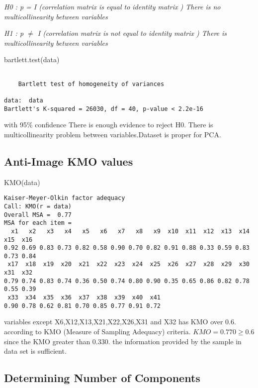 \documentclass[12pt,twoside]{deuthesis}
\newenvironment{Shaded}{\begin{snugshade}}{\end{snugshade}}
\newcommand{\FunctionTok}[1]{\textcolor[rgb]{0.00,0.00,0.00}{#1}}
\newcommand{\NormalTok}[1]{#1}
\begin{document}
\emph{H0 : p = I (correlation matrix is equal to identity matrix ) There is no multicollinearity between variables}

\setlength{\parindent}{0in}

\emph{H1 : p \(\neq\) I (correlation matrix is not equal to identity matrix ) There is multicollinearity between variables}
\begin{Shaded}
\begin{Highlighting}[]
\FunctionTok{bartlett.test}\NormalTok{(data)}
\end{Highlighting}
\end{Shaded}
\begin{verbatim}

    Bartlett test of homogeneity of variances

data:  data
Bartlett's K-squared = 26030, df = 40, p-value < 2.2e-16
\end{verbatim}
with 95\% confidence There is enough evidence to reject H0. There is multicollinearity problem between variables.Dataset is proper for PCA.

\hypertarget{anti-image-kmo-values}{%
\subsection{Anti-Image KMO values}\label{anti-image-kmo-values}}
\begin{Shaded}
\begin{Highlighting}[]
\FunctionTok{KMO}\NormalTok{(data)}
\end{Highlighting}
\end{Shaded}
\begin{verbatim}
Kaiser-Meyer-Olkin factor adequacy
Call: KMO(r = data)
Overall MSA =  0.77
MSA for each item = 
  x1   x2   x3   x4   x5   x6   x7   x8   x9  x10  x11  x12  x13  x14  x15  x16 
0.92 0.69 0.83 0.73 0.82 0.58 0.90 0.70 0.82 0.91 0.88 0.33 0.59 0.83 0.73 0.84 
 x17  x18  x19  x20  x21  x22  x23  x24  x25  x26  x27  x28  x29  x30  x31  x32 
0.79 0.74 0.83 0.74 0.36 0.50 0.74 0.80 0.90 0.35 0.65 0.86 0.82 0.78 0.55 0.39 
 x33  x34  x35  x36  x37  x38  x39  x40  x41 
0.90 0.78 0.62 0.81 0.70 0.85 0.77 0.91 0.72 
\end{verbatim}
variables except X6,X12,X13,X21,X22,X26,X31 and X32 has KMO over 0.6.
according to KMO (Measure of Sampling Adequacy) criteria. \(KMO= 0.770 \ge 0.6\) since the KMO greater than 0.330. the information provided by the sample in data set is sufficient.

\hypertarget{determining-number-of-components}{%
\subsection{Determining Number of Components}\label{determining-number-of-components}}
\end{document}
